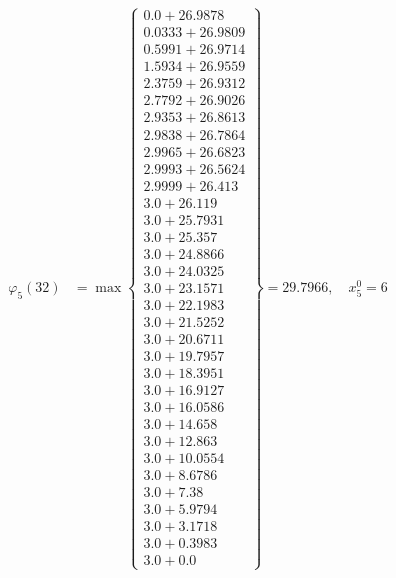 \documentclass{article}
\begin{document}
\begin{align*}
  
\varphi_{5}(32) &= \max \left\{ \begin{array}{c}
0.0 + 26.9878 \\
 0.0333 + 26.9809 \\
 0.5991 + 26.9714 \\
 1.5934 + 26.9559 \\
 2.3759 + 26.9312 \\
 2.7792 + 26.9026 \\
 2.9353 + 26.8613 \\
 2.9838 + 26.7864 \\
 2.9965 + 26.6823 \\
 2.9993 + 26.5624 \\
 2.9999 + 26.413 \\
 3.0 + 26.119 \\
 3.0 + 25.7931 \\
 3.0 + 25.357 \\
 3.0 + 24.8866 \\
 3.0 + 24.0325 \\
 3.0 + 23.1571 \\
 3.0 + 22.1983 \\
 3.0 + 21.5252 \\
 3.0 + 20.6711 \\
 3.0 + 19.7957 \\
 3.0 + 18.3951 \\
 3.0 + 16.9127 \\
 3.0 + 16.0586 \\
 3.0 + 14.658 \\
 3.0 + 12.863 \\
 3.0 + 10.0554 \\
 3.0 + 8.6786 \\
 3.0 + 7.38 \\
 3.0 + 5.9794 \\
 3.0 + 3.1718 \\
 3.0 + 0.3983 \\
 3.0 + 0.0
\end{array} \right\}=29.7966,\quad x_{5}^0=6\\
  
  
  

\end{align*}
\end{document}

